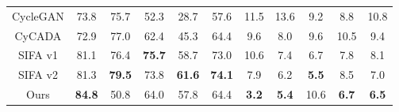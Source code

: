 \begin{table}[h]
{\begin{tabular}{c|*{5}{c}|*{5}{c}}
            CycleGAN\cite{zhu2017unpaired}      & 73.8    & 75.7      & 52.3       & 28.7      & 57.6          & 11.5      & 13.6      & 9.2       & 8.8       & 10.8\\
            CyCADA\cite{hoffman2018cycada}      & 72.9    & 77.0      & 62.4       & 45.3      & 64.4          & 9.6       & 8.0       & 9.6       & 10.5      & 9.4 \\        
            SIFA v1\cite{chen2019synergistic}   & 81.1    & 76.4 & \textbf{75.7}   & 58.7      & 73.0          & 10.6      & 7.4       & 6.7       & 7.8       & 8.1 \\
            SIFA v2\cite{chen2020unsupervised}  & 81.3 & \textbf{79.5} & 73.8 & \textbf{61.6} & \textbf{74.1}  & 7.9      & 6.2   & \textbf{5.5}  & 8.5       & 7.0 \\
            Ours                                & \textbf{84.8} & 50.8  & 64.0     & 57.8      & 64.4     & \textbf{3.2} & \textbf{5.4} & 10.6  & \textbf{6.7}  & \textbf{6.5} \\
            \bottomrule
        \end{tabular}}
    \label{tab:comparison}
\end{table}
